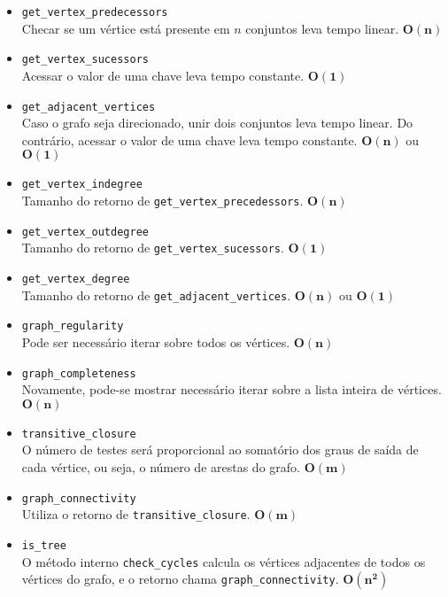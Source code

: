\documentclass{../sftex/sftex}
\begin{document}
\begin{itemize}
    \item \texttt{get\_vertex\_predecessors} \\
    Checar se um vértice está presente em $n$ conjuntos leva tempo linear.
    $\mathbf{O(n)}$

    \item \texttt{get\_vertex\_sucessors} \\
    Acessar o valor de uma chave leva tempo constante. $\mathbf{O(1)}$

    \item \texttt{get\_adjacent\_vertices} \\
    Caso o grafo seja direcionado, unir dois conjuntos leva tempo linear. Do
    contrário, acessar o valor de uma chave leva tempo constante. $\mathbf{O(n)}$
    ou $\mathbf{O(1)}$

    \item \texttt{get\_vertex\_indegree} \\
    Tamanho do retorno de \texttt{get\_vertex\_precedessors}. $\mathbf{O(n)}$

    \item \texttt{get\_vertex\_outdegree} \\
    Tamanho do retorno de \texttt{get\_vertex\_sucessors}. $\mathbf{O(1)}$

    \item \texttt{get\_vertex\_degree} \\
    Tamanho do retorno de \texttt{get\_adjacent\_vertices}. $\mathbf{O(n)}$ ou
    $\mathbf{O(1)}$

    \item \texttt{graph\_regularity} \\
    Pode ser necessário iterar sobre todos os vértices. $\mathbf{O(n)}$

    \item \texttt{graph\_completeness} \\
    Novamente, pode-se mostrar necessário iterar sobre a lista inteira de
    vértices. $\mathbf{O(n)}$

    \item \texttt{transitive\_closure} \\
    O número de testes será proporcional ao somatório dos graus de saída
    de cada vértice, ou seja, o número de arestas do grafo. $\mathbf{O(m)}$

    \item \texttt{graph\_connectivity} \\
    Utiliza o retorno de \texttt{transitive\_closure}. $\mathbf{O(m)}$

    \item \texttt{is\_tree} \\
    O método interno \texttt{check\_cycles} calcula os vértices adjacentes de
    todos os vértices do grafo, e o retorno chama \texttt{graph\_connectivity}.
    $\mathbf{O(n^2)}$
\end{itemize}
\end{document}
